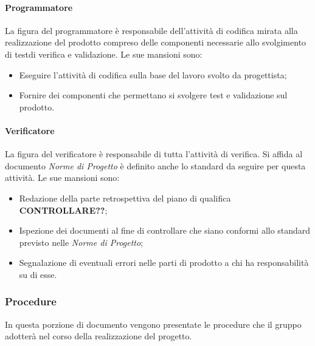 			\paragraph{Programmatore}
				La figura del programmatore è responsabile dell'attività di codifica mirata alla realizzazione del prodotto compreso delle componenti necessarie allo svolgimento di test\glosp di verifica e validazione.
				Le sue mansioni sono:
				\begin{itemize}
					\item Eseguire l'attività di codifica sulla base del lavoro svolto da progettista;
					\item Fornire dei componenti che permettano si svolgere test e validazione sul prodotto.
				\end{itemize}
			\paragraph{Verificatore}
				La figura del verificatore è responsabile di tutta l'attività di verifica.
				Si affida al documento \textit{Norme di Progetto} è definito anche lo standard da seguire per questa attività.
				Le sue mansioni sono:
				\begin{itemize}
					\item Redazione della parte retrospettiva del piano di qualifica \textbf{CONTROLLARE??};
					\item Ispezione dei documenti al fine di controllare che siano conformi allo standard previsto nelle \textit{Norme di Progetto};
					\item Segnalazione di eventuali errori nelle parti di prodotto a chi ha responsabilità su di esse.
				\end{itemize}
		\subsubsection{Procedure}
			In questa porzione di documento vengono presentate le procedure che il gruppo adotterà nel corso della realizzazione del progetto.
